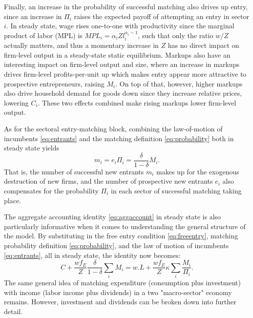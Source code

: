 \documentclass[a4paper,12pt]{article} %
\numberwithin{equation}{section} %
\numberwithin{figure}{section}
\numberwithin{table}{section}
\begin{document}
Finally, an increase in the probability of successful matching also drives up entry, since an increase in $\Pi_i$ raises the expected payoff of attempting
an entry in sector $i$. In steady state, wage rises one-to-one with productivity since the marginal product of labor (MPL) is 
$MPL_i = \alpha_i Z l_i^{\alpha_i -1}$, such that only the ratio $w/Z$ actually matters, and thus a momentary increase in $Z$ has no direct impact
on firm-level output in a steady-state static equilibrium. Markups also have an interesting impact on firm-level output and size, where an increase in 
markups drives firm-level profits-per-unit up which makes entry appear more attractive to prospective entrepreneurs, raising $M_i$.
On top of that, however, higher markups also drive household demand for goods down since they increase relative prices, 
lowering $C_i$. These two effects combined make rising markups lower firm-level output.

As for the sectoral entry-matching block, combining the law-of-motion of incumbents \eqref{eq:entrants} and the matching 
definition \eqref{eq:probability} both in steady state yields 
\begin{equation}
m_i= e_i\Pi_i= \frac{\delta}{1-\delta}M_i. \label{steadyentrants} 
\end{equation}
That is, the number of successful new entrants $m_i$ makes up for the exogenous destruction of new firms, and the 
number of prospective new entrants $e_i$ also compensates for the probability $\Pi_i$ in each sector of successful
matching taking place.

The aggregate accounting identity \eqref{eq:aggaccount} in steady state is also particularly informative when it
comes to understanding the general structure of the model. By substituting in the free entry condition 
\eqref{eq:freeentry}, matching probability definition \eqref{eq:probability}, and the law of motion of incumbents \eqref{eq:entrants}, 
all in steady state, the identity now becomes:
\begin{equation}
C + \frac{w f_E}{Z}\frac{\delta}{1-\delta}\sum_iM_{i}= w.L + \frac{w f_E}{Z}\kappa \sum_i\frac{M_i}{\Pi_i}. \label{aggsteadystate} 
\end{equation}
The same general idea of matching expenditure (consumption plus investment) with income (labor income plus dividends)
in a two "macro-sector" economy remains. However, investment and dividends can be broken down into further detail. 
\end{document}
